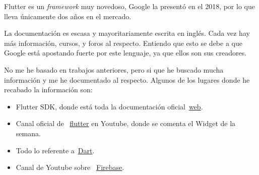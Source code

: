 
Flutter es un \emph{framework} muy novedoso, Google la presentó en el 2018, por lo que lleva únicamente dos años en el mercado.

La documentación es escasa y mayoritariamente escrita en inglés. Cada vez hay más información, cursos, y foros al respecto. Entiendo que esto se debe a que Google está apostando fuerte por este lenguaje, ya que ellos son sus creadores.

No me he basado en trabajos anteriores, pero si que he buscado mucha información y me he documentado al respecto. Algunos de los lugares donde he recabado la información son:


\begin{itemize}
	\item Flutter SDK, donde está toda la documentación oficial~\href{https://flutter.dev/}{web}.
	\item Canal oficial de  ~\href{https://www.youtube.com/watch?v=ukLBCRBlIkk&list=PLjxrf2q8roU1kMpfyJ4EY0pID2oRHtvGm}{flutter} en Youtube, donde se comenta el Widget de la semana.
	\item Todo lo referente a~\href{https://api.dart.dev/stable/2.8.4/index.html}{Dart}.
	\item Canal de Youtube sobre ~\href{https://www.youtube.com/channel/UCP4bf6IHJJQehibu6ai__cg}{Firebase}.
\end{itemize}